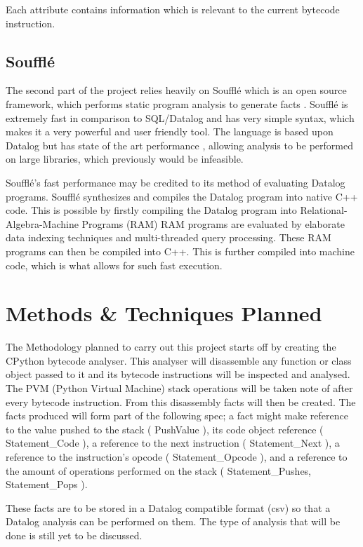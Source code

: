 \documentclass[12pt, a4paper]{report}
\theoremstyle{definition}
\theoremstyle{definition}%
\theoremstyle{definition}%
\theoremstyle{definition}%
\theoremstyle{definition}%
\theoremstyle{definition}%
\begin{document}
    \par Each attribute contains information which is relevant to the current bytecode instruction.
    
    \section{Soufflé} The second part of the project relies heavily on Soufflé which is an open source
    framework, which performs static program analysis to generate facts \cite{jordan2016souffle}. Soufflé is extremely fast in comparison
    to SQL/Datalog and has very simple syntax, which makes it a very powerful and user friendly tool. The language is based
    upon Datalog but has state of the art performance \cite{jordan2016souffle}, allowing analysis to be performed on large libraries,
    which previously would be infeasible. 
    
    \par Soufflé's fast performance may be credited to its method of evaluating Datalog programs. Soufflé synthesizes and compiles
    the Datalog program into native C++ code. This is possible by firstly compiling the Datalog program into Relational-Algebra-Machine Programs (RAM)
    RAM programs are evaluated by elaborate data indexing techniques and multi-threaded query processing. These RAM programs can then be compiled
    into C++. This is further compiled into machine code, which is what allows for such fast execution. \cite{varAwareDlog}


\chapter{Methods \& Techniques Planned}
The Methodology planned to carry out this project starts off by creating the CPython bytecode analyser. This analyser will disassemble 
any function or class object passed to it and its bytecode instructions will be inspected and analysed. The PVM (Python Virtual Machine)
stack operations will be taken note of after every bytecode instruction. From this disassembly facts will then be created. The facts produced will
form part of the following spec; a fact might make reference to the value pushed to the stack ({\selectfont 
PushValue%
}), its code object reference ({\selectfont 
Statement\_Code%
}), a reference to the next instruction ({\selectfont 
Statement\_Next%
}), a reference to the instruction's opcode ({\selectfont 
Statement\_Opcode%
}), and a reference to the amount of operations performed on the stack ({\selectfont 
Statement\_Pushes, Statement\_Pops%
}).
\par These facts are to be stored in a Datalog compatible format (csv) so that a Datalog analysis can be performed on them. The type of analysis 
that will be done is still yet to be discussed.
\end{document}
